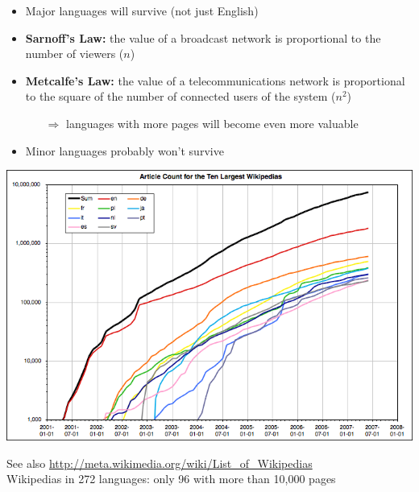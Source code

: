 \documentclass[a4paper,landscape,headrule,footrule,xetex]{foils}
\begin{document}
\MyLogo{}
\begin{itemize}
\item Major languages will survive (not just English)
\item \textbf{Sarnoff's Law:} the value of a broadcast network is
  proportional to the number of viewers ($n$)
\item \textbf{Metcalfe's Law:} the value of a telecommunications
    network is proportional to the square of the number of connected
    users of the system ($n^2$)
    \begin{itemize}
    \item[$\Rightarrow$] languages with more pages will become even more valuable
    \end{itemize}
\item Minor languages probably won't survive
\end{itemize}




\begin{center}
  \includegraphics[height=0.8\textheight]{../pics/TopTenWikipediasGraph}
\end{center}
 See also \url{http://meta.wikimedia.org/wiki/List_of_Wikipedias}
\\ Wikipedias in 272 languages: only 96 with more than 10,000 pages
\end{document}
